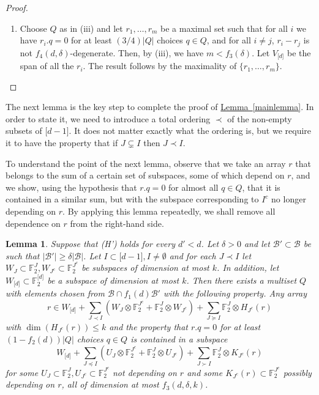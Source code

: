 \documentclass[11pt]{article}
\numberwithin{equation}{section}
\newtheorem{lemma}[theorem]{Lemma}
\theoremstyle{definition}
\theoremstyle{plain}
\newcommand{\expref}[2]{\hyperref[#2]{#1~\ref{#2}}}
\newcommand\F{\mathbb{F}}
\renewcommand\d{\delta}
\newcommand \cB{\mathcal B}
\newcommand \s{\subset}
\begin{document}
\begin{proof}
\begin{enumerate}[label=(\roman*)]
		\item Choose $Q$ as in (iii) and let $r_1,\dots,r_m$ be a maximal set such that for all $i$ we have $r_i.q=0$ for at least $({3}/{4})|Q|$ choices $q\in Q$, and for all $i\neq j$, $r_i-r_j$ is not $f_4(d,\d)$-degenerate. Then, by (iii), we have $m< f_3(\d)$. Let $V_{\lbrack d\rbrack}$ be the span of all the $r_i$. The result follows by the maximality of $\{r_1,\dots,r_m\}$.\qedhere
	\end{enumerate}
\end{proof}

The next lemma is the key step to complete the proof of \expref{Lemma}{mainlemma}. In order to state it, we need to introduce a total ordering $\prec$ of the non-empty subsets of $\lbrack d-1\rbrack$. It does not matter exactly what the ordering is, but we require it to have the property that if $J\subsetneq I$ then $J\prec I$.

To understand the point of the next lemma, observe that we take an array $r$ that belongs to the sum of a certain set of subspaces, some of which depend on $r$, and we show, using the hypothesis that $r.q=0$ for almost all $q\in Q$, that it is contained in a similar sum, but with the subspace corresponding to $I^c$ no longer depending on $r$. By applying this lemma repeatedly, we shall remove all dependence on $r$ from the right-hand side.

\begin{lemma} \label{keylemma}
	Suppose that (H') holds for every $d'<d$. Let $\d>0$ and let $\cB'\s \cB$ be such that $|\cB'|\geq \d|\cB|$. Let $I\s \lbrack d-1\rbrack, I\neq \emptyset$ and for each $J\prec I$ let $W_J\s \F_2^{J},W_{J^c}\s \F_2^{J^c}$ be subspaces of dimension at most $k$. In addition, let $W_{\lbrack d\rbrack}\s \F_2^{\lbrack d\rbrack}$ be a subspace of dimension at most $k$. Then there exists a multiset $Q$ with elements chosen from $\cB\cap f_1(d)\cB'$ with the following property. Any array 
	\[r\in W_{\lbrack d\rbrack}+ \sum_{J\prec I} (W_J\otimes \F_2^{J^c}+\F_2^{J}\otimes W_{J^c})+\sum_{J\succeq I} \F_2^{J}\otimes H_{J^c}(r)\] 
	with $\dim(H_{J^c}(r))\leq k$ and the property that $r.q=0$ for at least $(1-f_2(d))|Q|$ choices $q\in Q$ is contained in a subspace 
	\[W_{\lbrack d \rbrack}+\sum_{J\preceq I} (U_J\otimes \F_2^{J^c}+\F_2^{J}\otimes U_{J^c})+\sum_{J\succ I} \F_2^{J}\otimes K_{J^c}(r)\] 
	for some $U_J\s \F_2^{J},U_{J^c}\s \F_2^{J^c}$ not depending on $r$ and some $K_{J^c}(r)\s \F_2^{J^c}$ possibly depending on $r$, all of dimension at most $f_3(d,\d,k)$.
\end{lemma}
\end{document}
